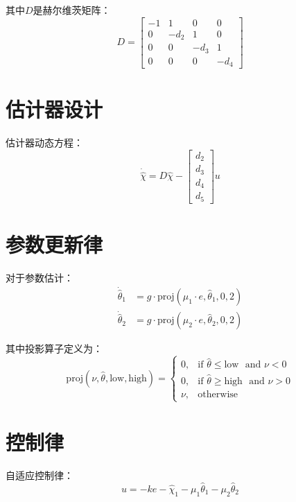 \documentclass{article}
\begin{document}
其中$D$是赫尔维茨矩阵：
\begin{equation}
D = 
\begin{bmatrix}
-1 & 1 & 0 & 0 \\
0 & -d_2 & 1 & 0 \\
0 & 0 & -d_3 & 1 \\
0 & 0 & 0 & -d_4
\end{bmatrix}
\end{equation}

\section{估计器设计}

估计器动态方程：
\begin{equation}
\dot{\hat{\chi}} = D\hat{\chi} - 
\begin{bmatrix} 
d_2 \\ d_3 \\ d_4 \\ d_5
\end{bmatrix} u
\end{equation}

\section{参数更新律}

对于参数估计：
\begin{align}
\dot{\hat{\theta}}_1 &= g \cdot \text{proj}(\mu_1 \cdot e, \hat{\theta}_1, 0, 2) \\
\dot{\hat{\theta}}_2 &= g \cdot \text{proj}(\mu_2 \cdot e, \hat{\theta}_2, 0, 2)
\end{align}

其中投影算子定义为：
\begin{equation}
\text{proj}(\nu, \hat{\theta}, \text{low}, \text{high}) = 
\begin{cases}
0, & \text{if } \hat{\theta} \leq \text{low } \text{ and } \nu < 0 \\
0, & \text{if } \hat{\theta} \geq \text{high } \text{ and } \nu > 0 \\
\nu, & \text{otherwise}
\end{cases}
\end{equation}

\section{控制律}

自适应控制律：
\begin{equation}
u = -ke - \hat{\chi}_1 - \mu_1\hat{\theta}_1 - \mu_2\hat{\theta}_2
\end{equation}
\end{document}
